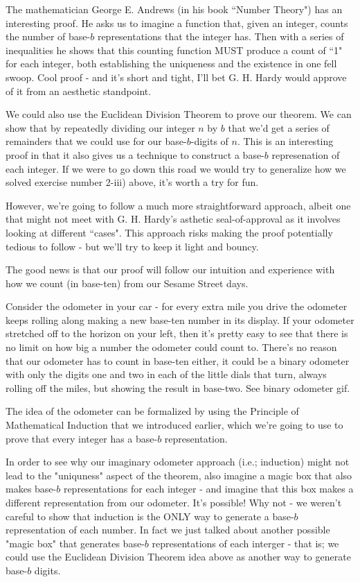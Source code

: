 \documentclass{article}
\begin{document}
The mathematician George E. Andrews (in his book
``Number Theory") has an interesting proof.
He asks us to imagine a function that, given an integer,
counts the number of base-$b$ representations that the integer has.
Then with a series of inequalities he shows that this counting function
MUST produce a count of ``1" for each integer, both establishing the uniqueness 
and the existence in one fell swoop.
Cool proof - and it's short and tight, I'll bet G. H. Hardy would approve of
it from an aesthetic standpoint.

We could also use the Euclidean Division Theorem to prove our
theorem.
We can show that by repeatedly dividing our integer $n$ by $b$
that we'd get a series of remainders that we could use for our base-$b$-digits of $n$.
This is an interesting proof in that it also gives us a technique
to construct a base-$b$ represenation of each integer.
If we were to go down this road
we would try to generalize how we solved
exercise number 2-iii) above, it's worth a try for fun.

However, we're going to follow a much more straightforward approach,
albeit one that might not meet with G. H. Hardy's asthetic seal-of-approval
as it involves looking at different ``cases". This approach risks making
the proof potentially tedious to follow - but we'll try to keep it light
and bouncy.

The good news is that our proof will follow our intuition and experience with
how we count (in base-ten) from our Sesame Street days.

Consider the odometer in your car - for every extra mile
you drive the odometer keeps rolling along
making a new base-ten number in its display.
If your odometer stretched off to the horizon on your left,
then it's pretty easy to see that there is
no limit on how big a number the odometer could count to.
There's no reason that our odometer has to count in base-ten either,
it could be a binary odometer with only the digits one and two in each of the 
little dials that turn, always
rolling off the miles, but showing the result in base-two.
See binary odometer gif.

The idea of the odometer can be formalized by using
the Principle of Mathematical Induction that we introduced earlier,
which we're going to use to prove that every integer has a base-$b$ representation.

In order to see why
our imaginary odometer
approach (i.e.; induction) might not lead to the "uniquness" aspect of 
the theorem, also imagine
a magic box
that also makes base-$b$ representations for each
integer - and imagine that this box makes a different representation from our odometer.
It's possible! Why not - we weren't careful to show that induction is the ONLY way
to generate a base-$b$ representation of each number.
In fact we just talked about another possible "magic box" that generates base-$b$ 
representations of each interger - that is;
we could use the Euclidean Division Theorem idea
above as another way to generate base-$b$ digits.
\end{document}
